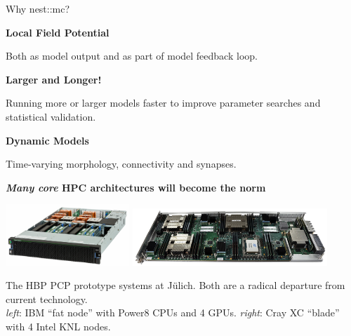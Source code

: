 \documentclass[a0paper,portrait]{baposter}
\newcommand{\nestmc}{{\textcolor{blue!30!black}{nest::mc}}\xspace}
\newcommand{\julich}{J\"ulich\xspace}
\newcommand{\centerheader}[1]{\begin{center}\bfseries\Large{#1}\end{center} \vspace{-6pt}}
\newcommand{\imageheader}[1]{\begin{center}\bfseries\large{#1}\end{center} \vspace{-2pt}}
\newcommand{\newemph}[1]{{\color{blue!40!black}\em #1}}
\begin{document}
\begin{poster}
\begin{posterbox}[name=motivation,column=0,row=0,span=2]{Why \nestmc?}
    \begin{minipage}[t]{0.3\textwidth}
        \centerheader{Local Field Potential}
        \vspace{4pt}
        \centering
        Both as model output and as part of model feedback loop.
    \end{minipage}
    \hfill
    \begin{minipage}[t]{0.3\textwidth}
        \centerheader{Larger and Longer!}
        \vspace{4pt}
        \centering
        Running more or larger models faster to improve parameter searches and statistical validation.
    \end{minipage}
    \hfill
    \begin{minipage}[t]{0.3\textwidth}
        \vspace{0pt}
        \centerheader{Dynamic Models}
        \vspace{12pt}
        \centering
        Time-varying morphology, connectivity and synapses.
    \end{minipage}

    \imageheader{\newemph{Many core} HPC architectures will become the norm}

    \hfill
    \includegraphics[width=0.35\textwidth]{images/juron.jpg}
    \hfill
    \includegraphics[width=0.55\textwidth]{images/knlnode.jpg}
    \hspace{0.5cm}

    \begin{center}
        The HBP PCP prototype systems at \julich. Both are a radical departure from current technology. \\
        \newemph{left}: IBM ``fat node'' with Power8 CPUs and 4 GPUs. \newemph{right}: Cray XC ``blade'' with 4 Intel KNL nodes.
    \end{center}


\end{posterbox}
\end{poster}
\end{document}
